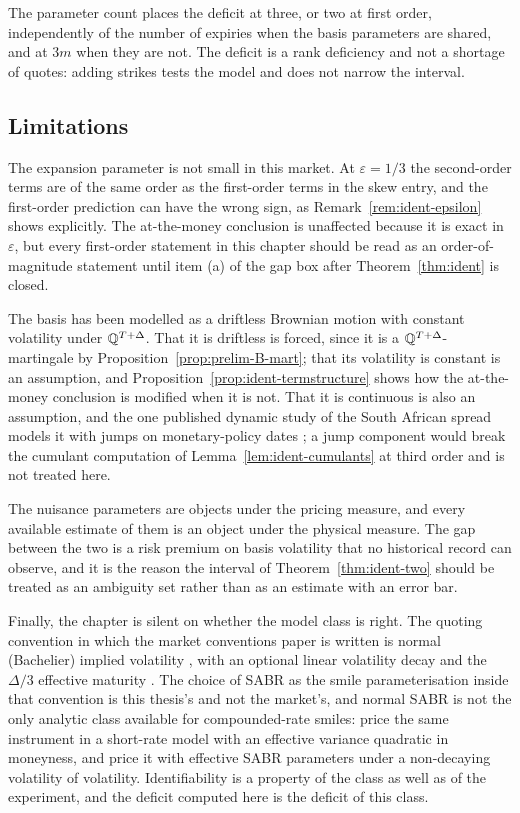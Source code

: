 \documentclass[../../../main.tex]{subfiles}
\begin{document}
The parameter count places the deficit at three, or two at first order, independently of the number of expiries when the basis parameters are shared, and at $3m$ when they are not. The deficit is a rank deficiency and not a shortage of quotes: adding strikes tests the model and does not narrow the interval.

\subsection{Limitations}

The expansion parameter is not small in this market. At $\varepsilon=1/3$ the second-order terms are of the same order as the first-order terms in the skew entry, and the first-order prediction can have the wrong sign, as Remark~\ref{rem:ident-epsilon} shows explicitly. The at-the-money conclusion is unaffected because it is exact in $\varepsilon$, but every first-order statement in this chapter should be read as an order-of-magnitude statement until item (a) of the gap box after Theorem~\ref{thm:ident} is closed.

The basis has been modelled as a driftless Brownian motion with constant volatility under $\mathbb{Q}^{T+\Delta}$. That it is driftless is forced, since it is a $\mathbb{Q}^{T+\Delta}$-martingale by Proposition~\ref{prop:prelim-B-mart}; that its volatility is constant is an assumption, and Proposition~\ref{prop:ident-termstructure} shows how the at-the-money conclusion is modified when it is not. That it is continuous is also an assumption, and the one published dynamic study of the South African spread models it with jumps on monetary-policy dates \citep[Abstract]{alfeus2026}; a jump component would break the cumulant computation of Lemma~\ref{lem:ident-cumulants} at third order and is not treated here.

The nuisance parameters are objects under the pricing measure, and every available estimate of them is an object under the physical measure. The gap between the two is a risk premium on basis volatility that no historical record can observe, and it is the reason the interval of Theorem~\ref{thm:ident-two} should be treated as an ambiguity set rather than as an estimate with an error bar.

Finally, the chapter is silent on whether the model class is right. The quoting convention in which the market conventions paper is written is normal (Bachelier) implied volatility \citep[\S8, p.~26]{sarb2024conv}, with an optional linear volatility decay and the $\Delta/3$ effective maturity \citep[\S8.3.1--\S8.3.2, pp.~28--29]{sarb2024conv}. The choice of SABR as the smile parameterisation inside that convention is this thesis's and not the market's, and normal SABR is not the only analytic class available for compounded-rate smiles: \citet[Thm.~5.1, p.~7]{turfus2023} price the same instrument in a short-rate model with an effective variance quadratic in moneyness, and \citet[Thms.~4.1--4.2]{willems2020} price it with effective SABR parameters under a non-decaying volatility of volatility. Identifiability is a property of the class as well as of the experiment, and the deficit computed here is the deficit of this class.
\end{document}
